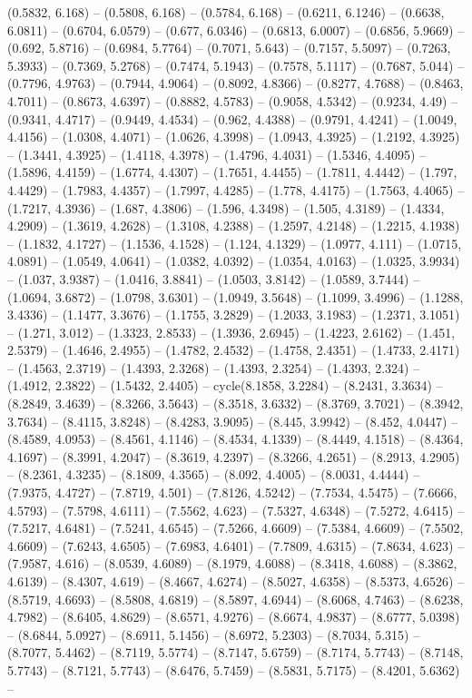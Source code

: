 (0.5832, 6.168) -- (0.5808, 6.168) -- (0.5784, 6.168) -- (0.6211, 6.1246) -- (0.6638, 6.0811) -- (0.6704, 6.0579) -- (0.677, 6.0346) -- (0.6813, 6.0007) -- (0.6856, 5.9669) -- (0.692, 5.8716) -- (0.6984, 5.7764) -- (0.7071, 5.643) -- (0.7157, 5.5097) -- (0.7263, 5.3933) -- (0.7369, 5.2768) -- (0.7474, 5.1943) -- (0.7578, 5.1117) -- (0.7687, 5.044) -- (0.7796, 4.9763) -- (0.7944, 4.9064) -- (0.8092, 4.8366) -- (0.8277, 4.7688) -- (0.8463, 4.7011) -- (0.8673, 4.6397) -- (0.8882, 4.5783) -- (0.9058, 4.5342) -- (0.9234, 4.49) -- (0.9341, 4.4717) -- (0.9449, 4.4534) -- (0.962, 4.4388) -- (0.9791, 4.4241) -- (1.0049, 4.4156) -- (1.0308, 4.4071) -- (1.0626, 4.3998) -- (1.0943, 4.3925) -- (1.2192, 4.3925) -- (1.3441, 4.3925) -- (1.4118, 4.3978) -- (1.4796, 4.4031) -- (1.5346, 4.4095) -- (1.5896, 4.4159) -- (1.6774, 4.4307) -- (1.7651, 4.4455) -- (1.7811, 4.4442) -- (1.797, 4.4429) -- (1.7983, 4.4357) -- (1.7997, 4.4285) -- (1.778, 4.4175) -- (1.7563, 4.4065) -- (1.7217, 4.3936) -- (1.687, 4.3806) -- (1.596, 4.3498) -- (1.505, 4.3189) -- (1.4334, 4.2909) -- (1.3619, 4.2628) -- (1.3108, 4.2388) -- (1.2597, 4.2148) -- (1.2215, 4.1938) -- (1.1832, 4.1727) -- (1.1536, 4.1528) -- (1.124, 4.1329) -- (1.0977, 4.111) -- (1.0715, 4.0891) -- (1.0549, 4.0641) -- (1.0382, 4.0392) -- (1.0354, 4.0163) -- (1.0325, 3.9934) -- (1.037, 3.9387) -- (1.0416, 3.8841) -- (1.0503, 3.8142) -- (1.0589, 3.7444) -- (1.0694, 3.6872) -- (1.0798, 3.6301) -- (1.0949, 3.5648) -- (1.1099, 3.4996) -- (1.1288, 3.4336) -- (1.1477, 3.3676) -- (1.1755, 3.2829) -- (1.2033, 3.1983) -- (1.2371, 3.1051) -- (1.271, 3.012) -- (1.3323, 2.8533) -- (1.3936, 2.6945) -- (1.4223, 2.6162) -- (1.451, 2.5379) -- (1.4646, 2.4955) -- (1.4782, 2.4532) -- (1.4758, 2.4351) -- (1.4733, 2.4171) -- (1.4563, 2.3719) -- (1.4393, 2.3268) -- (1.4393, 2.3254) -- (1.4393, 2.324) -- (1.4912, 2.3822) -- (1.5432, 2.4405) -- cycle(8.1858, 3.2284) -- (8.2431, 3.3634) -- (8.2849, 3.4639) -- (8.3266, 3.5643) -- (8.3518, 3.6332) -- (8.3769, 3.7021) -- (8.3942, 3.7634) -- (8.4115, 3.8248) -- (8.4283, 3.9095) -- (8.445, 3.9942) -- (8.452, 4.0447) -- (8.4589, 4.0953) -- (8.4561, 4.1146) -- (8.4534, 4.1339) -- (8.4449, 4.1518) -- (8.4364, 4.1697) -- (8.3991, 4.2047) -- (8.3619, 4.2397) -- (8.3266, 4.2651) -- (8.2913, 4.2905) -- (8.2361, 4.3235) -- (8.1809, 4.3565) -- (8.092, 4.4005) -- (8.0031, 4.4444) -- (7.9375, 4.4727) -- (7.8719, 4.501) -- (7.8126, 4.5242) -- (7.7534, 4.5475) -- (7.6666, 4.5793) -- (7.5798, 4.6111) -- (7.5562, 4.623) -- (7.5327, 4.6348) -- (7.5272, 4.6415) -- (7.5217, 4.6481) -- (7.5241, 4.6545) -- (7.5266, 4.6609) -- (7.5384, 4.6609) -- (7.5502, 4.6609) -- (7.6243, 4.6505) -- (7.6983, 4.6401) -- (7.7809, 4.6315) -- (7.8634, 4.623) -- (7.9587, 4.616) -- (8.0539, 4.6089) -- (8.1979, 4.6088) -- (8.3418, 4.6088) -- (8.3862, 4.6139) -- (8.4307, 4.619) -- (8.4667, 4.6274) -- (8.5027, 4.6358) -- (8.5373, 4.6526) -- (8.5719, 4.6693) -- (8.5808, 4.6819) -- (8.5897, 4.6944) -- (8.6068, 4.7463) -- (8.6238, 4.7982) -- (8.6405, 4.8629) -- (8.6571, 4.9276) -- (8.6674, 4.9837) -- (8.6777, 5.0398) -- (8.6844, 5.0927) -- (8.6911, 5.1456) -- (8.6972, 5.2303) -- (8.7034, 5.315) -- (8.7077, 5.4462) -- (8.7119, 5.5774) -- (8.7147, 5.6759) -- (8.7174, 5.7743) -- (8.7148, 5.7743) -- (8.7121, 5.7743) -- (8.6476, 5.7459) -- (8.5831, 5.7175) -- (8.4201, 5.6362) -- 